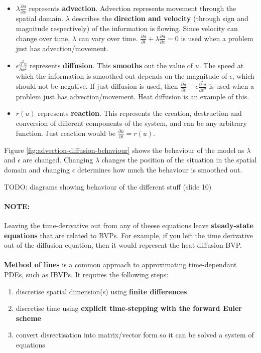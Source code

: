 \documentclass{article}
\begin{document}
\begin{itemize}
	\item $\lambda\frac{\partial u}{\partial x}$  represents \textbf{advection}. Advection represents movement through the spatial domain. $\lambda$ describes the \textbf{direction and velocity} (through sign and magnitude respectively) of the information is flowing. Since velocity can change over time, $\lambda$ can vary over time. $\frac{\partial u}{\partial t} + \lambda\frac{\partial u}{\partial x} = 0$ is used when a problem just has advection/movement.
	\item $\epsilon \frac{\partial^2 u}{\partial x^2}$ represents \textbf{diffusion}. This \textbf{smooths} out the value of $u$. The speed at which the information is smoothed out depends on the magnitude of $\epsilon$, which should not be negative. If just diffusion is used, then $\frac{\partial u}{\partial t} + \epsilon\frac{\partial^2 u}{\partial x^2}$ is used when a problem just has advection/movement. Heat diffusion is an example of this.
	\item $r(u)$ represents \textbf{reaction}. This represents the creation, destruction and conversion of different components of the system, and can be any arbitrary function. Just reaction would be $\frac{\partial u}{\partial t} = r(u)$.
\end{itemize}
Figure \ref{fig:advection-diffusion-behaviour} shows the behaviour of the model as $\lambda$ and $\epsilon$ are changed. Changing $\lambda$ changes the position of the situation in the spatial domain and changing $\epsilon$ determines how much the behaviour is smoothed out.

TODO: diagrams showing behaviour of the different stuff (slide 10)

\paragraph{\textbf{NOTE:}} Leaving the time-derivative out from any of theese equations leave \textbf{steady-state equations} that are related to BVPs. For example, if you left the time derivative out of the diffusion equation, then it would represent the heat diffusion BVP.
\paragraph{}

\textbf{Method of lines} is a common approach to approximating time-dependant PDEs, such as IBVPs. It requires the following steps:
\begin{enumerate}
	\item discretise spatial dimension(s) using \textbf{finite differences}
	\item discretise time using \textbf{explicit time-stepping with the forward Euler scheme}
	\item convert disrectisation into matrix/vector form so it can be solved a system of equations
\end{enumerate}
\end{document}
